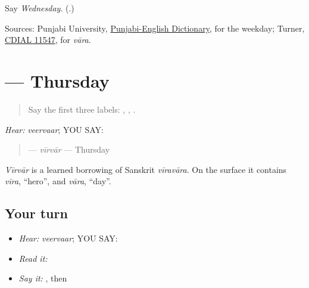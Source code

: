 \begin{tcolorbox}[breakable,colback=teal!4,colframe=teal!35!black,title={Before you move on}]
Say \emph{Wednesday}. (\textbf{}.)

Sources: Punjabi University, \href{https://dic.learnpunjabi.org/default.aspx?look=\%E0\%A8\%AC\%E0\%A9\%81\%E0\%A9\%B1\%E0\%A8\%A7\%E0\%A8\%B5\%E0\%A8\%BE\%E0\%A8\%B0}{Punjabi-English Dictionary}, for the weekday; Turner, \href{https://dsal.uchicago.edu/dictionaries/soas/}{CDIAL 11547}, for \emph{vāra}.
\end{tcolorbox}
\section[\texorpdfstring{\pa{ਵੀਰਵਾਰ} (veervaar)}{ਵੀਰਵਾਰ (veervaar)}]{ — Thursday}

\label{lesson:PA-C182-veervar}



\begin{quote}
Say the first three labels: \textbf{}, \textbf{}, \textbf{}.
\end{quote}

\begin{grammarlens}[title={Grammar Lens: one weekday by ear}]
\emph{Hear:} \emph{veervaar}; YOU SAY: \textbf{}

\begin{quote}
\textbf{} — \emph{vīrvār} — Thursday
\end{quote}
\end{grammarlens}

\begin{cousinweb}
\emph{Vīrvār} is a learned borrowing of Sanskrit \emph{vīravāra}. On the surface it contains \emph{vīra}, \textquotedblleft{}hero\textquotedblright{}, and \emph{vāra}, \textquotedblleft{}day\textquotedblright{}.
\end{cousinweb}

\subsection*{Your turn}
\begin{itemize}
\raggedright
  \item \emph{Hear:} \emph{veervaar}; YOU SAY: \textbf{}
  \item \emph{Read it:} \textbf{}
  \item \emph{Say it:} \textbf{}, then \textbf{}
\end{itemize}

